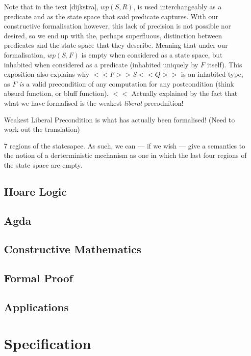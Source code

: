 \documentclass[oneside,12pt]{article}
\begin{document}
Note that in the text [dijkstra], $wp(S,R)$, is used interchangeably as a predicate and as the state space that said predicate captures. With our constructive formalisation however, this lack of precision is not possible nor desired, so we end up with the, perhaps superfluous, distinction between predicates and the state space that they describe. Meaning that under our formalisation, $wp(S,F)$ is empty when considered as a state space, but inhabited when considered as a predicate (inhabited uniquely by $F$ itself). This exposition also explains why $<<F>> S <<Q>>$ is an inhabited type, as $F$ \emph{is} a valid precondition of any computation for any postcondition (think absurd function, or bluff function). $<<$ Actually explained by the fact that what we have formalised is the weakest \emph{liberal} precodnition!


Weakest Liberal Precondition is what has actually been formalised! (Need to work out the translation)


7 regions of the statesapce. As such, we can --- if we wish --- give a semantics to the notion of a derterministic mechanism as one in which the last four regions of the state space are empty.

\subsection{Hoare Logic}


\subsection{Agda}

\subsection{Constructive Mathematics}

\subsection{Formal Proof}

\subsection{Applications}

\section{Specification}
\end{document}
